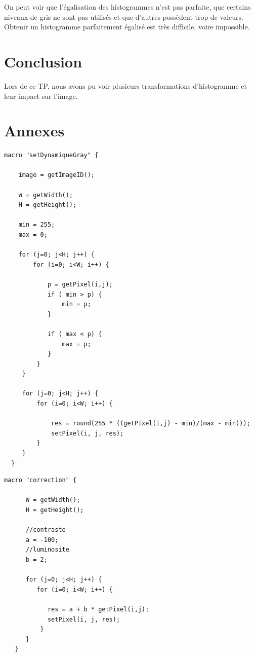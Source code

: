 \documentclass[a4paper,11pt]{article}
\begin{document}
  On peut voir que l'égalisation des histogrammes n'est pas parfaite, que certains niveaux de gris ne sont pas utilisés et que d'autres 
  possèdent trop de valeurs. Obtenir un histogramme parfaitement égalisé est très difficile, voire impossible.
  \section*{Conclusion}
  Lors de ce TP, nous avons pu voir plusieurs transformations d'histogramme et leur impact sur l'image.
  \newpage
  
  \section*{Annexes}
  \begin{lstlisting}[caption=Macro d'extension d'histogramme]
  macro "setDynamiqueGray" {

    image = getImageID();

    W = getWidth();
    H = getHeight();

    min = 255;
    max = 0;

    for (j=0; j<H; j++) {
        for (i=0; i<W; i++) {

            p = getPixel(i,j);
            if ( min > p) {
                min = p;
            }

            if ( max < p) {
                max = p;
            }
         }
     }

     for (j=0; j<H; j++) {
         for (i=0; i<W; i++) {

             res = round(255 * ((getPixel(i,j) - min)/(max - min)));
             setPixel(i, j, res);
         }
     }
  }
  \end{lstlisting}
  
  \begin{lstlisting}[caption=Macro de la correction affine]
   macro "correction" {

      W = getWidth();
      H = getHeight();

      //contraste
      a = -100;
      //luminosite
      b = 2;

      for (j=0; j<H; j++) {
         for (i=0; i<W; i++) {

            res = a + b * getPixel(i,j);
            setPixel(i, j, res);
          }
      }
   }
  \end{lstlisting}

    
\end{document}
